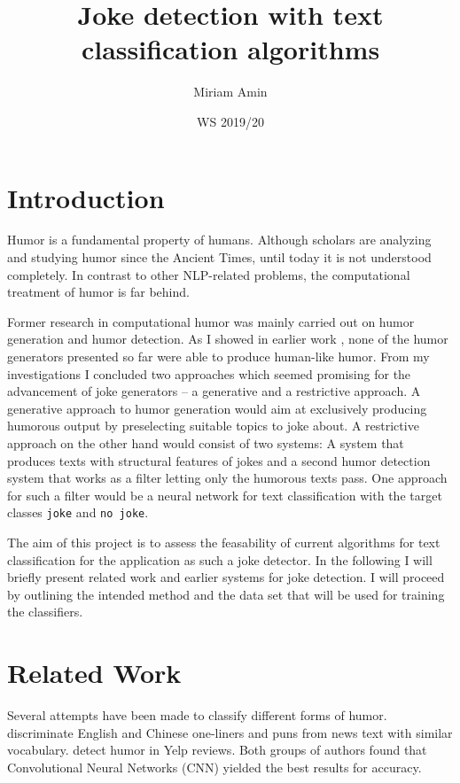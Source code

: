 \documentclass[12pt]{scrartcl}
\title{Joke detection with text classification algorithms}
\author{Miriam Amin}
\date{WS 2019/20}
\begin{document}
\maketitle
\section{Introduction}
Humor is a fundamental property of humans.
Although scholars are analyzing and studying humor since the Ancient Times, until today it is not understood completely. In contrast to other NLP-related problems, the computational treatment of humor is far behind. 

Former research in computational humor was mainly carried out on humor generation and humor detection. As I showed in earlier work \citep{aminComputationalHumorAutomatic2019}, none of the humor generators presented so far were able to produce human-like humor. 
From my investigations I concluded two approaches which seemed promising for the advancement of joke generators -- a generative and a restrictive approach. A generative approach to humor generation would aim at exclusively producing humorous output by preselecting suitable topics to joke about. A restrictive approach on the other hand would consist of two systems: A system that produces texts with structural features of jokes and a second humor detection system that works as a filter letting only the humorous texts pass.  
One approach for such a filter would be a neural network for text classification with the target classes \texttt{joke} and \texttt{no joke}.

The aim of this project is to assess the feasability of current algorithms for text classification for the application as such a joke detector. In the following I will briefly present related work and earlier systems for joke detection. I will proceed by outlining the intended method and the data set that will be used for training the classifiers. 

 

\section{Related Work}
Several attempts have been made to classify different forms of humor. \cite{chenHumorRecognitionUsing2018} discriminate English and Chinese one-liners and puns from news text with similar vocabulary. \cite{oliveiraHumorDetectionYelp2015} detect humor in Yelp reviews. Both groups of authors found that Convolutional Neural Networks (CNN) yielded the best results for accuracy. 
\end{document}
